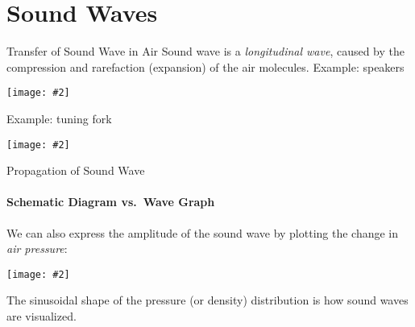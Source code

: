 \documentclass[12pt,aspectratio=169]{beamer}
\newcommand{\pic}[2]{\texttt{[image: \#2]}}
\begin{document}
%  
%
%



\section{Sound Waves}

\begin{frame}{Transfer of Sound Wave in Air}
  Sound wave is a \emph{longitudinal wave}, caused by the compression and
  rarefaction (expansion) of the air molecules. Example: speakers
  \begin{center}
    \vspace{-.1in}\pic{.5}{speaker.jpg}
  \end{center}
  Example: tuning fork
    \begin{center}
    \vspace{-.1in}\pic{.5}{tuningfork.jpg}
  \end{center}
\end{frame}

\begin{frame}{Propagation of Sound Wave}
  \framesubtitle{Schematic Diagram vs.\ Wave Graph}
  We can also express the amplitude of the sound wave by plotting the change in
  \emph{air pressure}:
  \begin{center}
    \vspace{-.2in}\pic{.6}{schematic-vs-graph.png}
  \end{center}
  The sinusoidal shape of the pressure (or density) distribution is how sound
  waves are visualized.
\end{frame}
\end{document}

